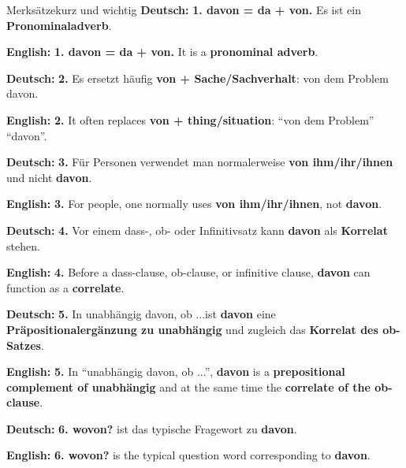 \documentclass[a4paper,11pt]{article}
\newcommand{\GermanText}[1]{\textbf{Deutsch: }#1\par}
\newcommand{\EnglishText}[1]{{\small\color{SoftGray}\textbf{English: }#1\par}}
\begin{document}
        \begin{grammarentry}{Merksätze}{kurz und wichtig}
            \GermanText{\textbf{1. davon = da + von.} Es ist ein \textbf{Pronominaladverb}.}
            \EnglishText{\textbf{1. davon = da + von.} It is a \textbf{pronominal adverb}.}

            \GermanText{\textbf{2.} Es ersetzt häufig \textbf{von + Sache/Sachverhalt}: \glqq von dem Problem\grqq \textrightarrow{} \glqq davon\grqq.}
            \EnglishText{\textbf{2.} It often replaces \textbf{von + thing/situation}: ``von dem Problem'' \textrightarrow{} ``davon''.}

            \GermanText{\textbf{3.} Für Personen verwendet man normalerweise \textbf{von ihm/ihr/ihnen} und nicht \textbf{davon}.}
            \EnglishText{\textbf{3.} For people, one normally uses \textbf{von ihm/ihr/ihnen}, not \textbf{davon}.}

            \GermanText{\textbf{4.} Vor einem dass-, ob- oder Infinitivsatz kann \textbf{davon} als \textbf{Korrelat} stehen.}
            \EnglishText{\textbf{4.} Before a dass-clause, ob-clause, or infinitive clause, \textbf{davon} can function as a \textbf{correlate}.}

            \GermanText{\textbf{5.} In \glqq unabhängig davon, ob ...\grqq ist \textbf{davon} eine \textbf{Präpositionalergänzung zu unabhängig} und zugleich das \textbf{Korrelat des ob-Satzes}.}
            \EnglishText{\textbf{5.} In ``unabhängig davon, ob ...'', \textbf{davon} is a \textbf{prepositional complement of unabhängig} and at the same time the \textbf{correlate of the ob-clause}.}

            \GermanText{\textbf{6. wovon?} ist das typische Fragewort zu \textbf{davon}.}
            \EnglishText{\textbf{6. wovon?} is the typical question word corresponding to \textbf{davon}.}
        \end{grammarentry}
\end{document}
